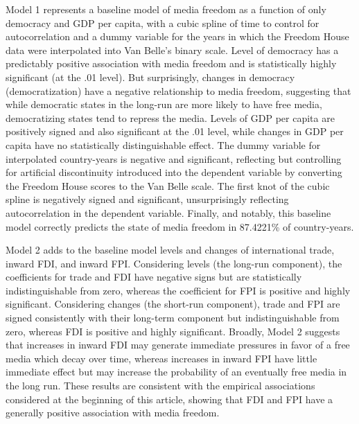 \documentclass[a4paper]{article}\usepackage[]{graphicx}\usepackage[]{color}
\begin{document}
Model 1 represents a baseline model of media freedom as a function of only democracy and GDP per capita, with a cubic spline of time to control for autocorrelation \parencite{Beck:1998wg} and a dummy variable for the years in which the Freedom House data were interpolated into Van Belle's binary scale. Level of democracy has a predictably positive association with media freedom and is statistically highly significant (at the .01 level). But surprisingly, changes in democracy (democratization) have a negative relationship to media freedom, suggesting that while democratic states in the long-run are more likely to have free media, democratizing states tend to repress the media. Levels of GDP per capita are positively signed and also significant at the .01 level, while changes in GDP per capita have no statistically distinguishable effect. The dummy variable for interpolated country-years is negative and significant, reflecting but controlling for artificial discontinuity introduced into the dependent variable by converting the Freedom House scores to the Van Belle scale. The first knot of the cubic spline is negatively signed and significant, unsurprisingly reflecting autocorrelation in the dependent variable. Finally, and notably, this baseline model correctly predicts the state of media freedom in 87.4221\% of country-years.

Model 2 adds to the baseline model levels and changes of international trade, inward FDI, and inward FPI. Considering levels (the long-run component), the coefficients for trade and FDI have negative signs but are statistically indistinguishable from zero, whereas the coefficient for FPI is positive and highly significant. Considering changes (the short-run component), trade and FPI are signed consistently with their long-term component but indistinguishable from zero, whereas FDI is positive and highly significant. Broadly, Model 2 suggests that increases in inward FDI may generate immediate pressures in favor of a free media which decay over time, whereas increases in inward FPI have little immediate effect but may increase the probability of an eventually free media in the long run. These results are consistent with the empirical associations considered at the beginning of this article, showing that FDI and FPI have a generally positive association with media freedom.
\end{document}
